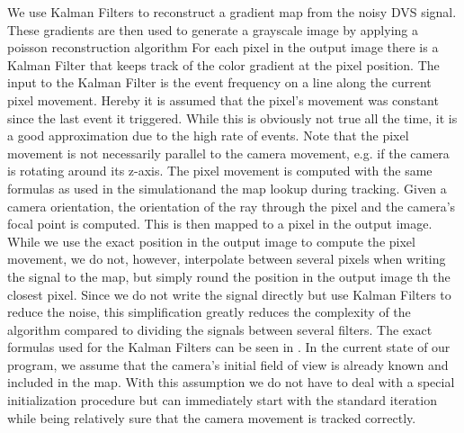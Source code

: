 We use Kalman Filters to reconstruct a gradient map from the noisy DVS signal. These gradients are then used to generate a grayscale image by applying a poisson reconstruction algorithm \cite{raskarpoisson} For each pixel in the output image there is a Kalman Filter that keeps track of the color gradient at the pixel position. The input to the Kalman Filter is the event frequency on a line along the current pixel movement. Hereby it is assumed that the pixel's movement was constant since the last event it triggered. While this is obviously not true all the time, it is a good approximation due to the high rate of events. Note that the pixel movement is not necessarily parallel to the camera movement, e.g. if the camera is rotating around its z-axis.
The pixel movement is computed with the same formulas as used in the simulationand the map lookup during tracking. Given a camera orientation, the orientation of the ray through the pixel and the camera's focal point is computed. This is then mapped to a pixel in the output image. While we use the exact position in the output image to compute the pixel movement,  we do not, however, interpolate between several pixels when writing the signal to the map, but simply round the position in the output image th the closest pixel. Since we do not write the signal directly but use Kalman Filters to reduce the noise, this simplification greatly reduces the complexity of the algorithm compared to dividing the signals between several filters.
The exact formulas used for the Kalman Filters can be seen in \cite{kim2014simultaneous}.
In the current state of our program, we assume that the camera's initial field of view is already known and included in the map. With this assumption we do not have to deal with a special initialization procedure but can immediately start with the standard iteration while being relatively sure that the camera movement is tracked correctly.
